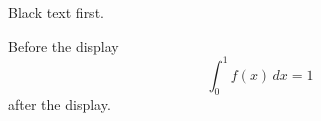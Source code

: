 \documentclass[12pt]{article}
\begin{document}
Black text first.

\color{teal}Before the display
\[ \int_0^1 f(x)\,dx = 1 \]
after the display.
\end{document}
